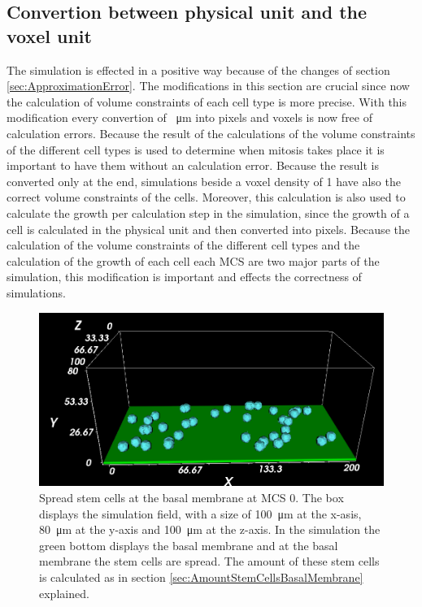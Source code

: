 \subsection{Convertion between physical unit and the voxel unit}
The simulation is effected in a positive way because of the changes of section \ref{sec:ApproximationError}. The modifications in this section are crucial since now the calculation of volume constraints of each cell type is more precise. With this modification every convertion of \SI{}{\micro\metre} into pixels and voxels is now free of calculation errors. Because the result of the calculations of the volume constraints of the different cell types is used to determine when mitosis takes place it is important to have them without an calculation error. Because the result is converted only at the end, simulations beside a voxel density of 1 have also the correct volume constraints of the cells. Moreover, this calculation is also used to calculate the growth per calculation step in the simulation, since the growth of a cell is calculated in the physical unit and then converted into pixels. Because the calculation of the volume constraints of the different cell types and the calculation of the growth of each cell each \ac{MCS} are two major parts of the simulation, this modification is important and effects the correctness of simulations.
\newline
\newline

\begin{figure}[ht]
	\center
	\includegraphics[scale=0.4]{figures/SimulationAtMCS0.png}
	\caption[Spread stem cells at the basal membrane at \ac{MCS} 0]{Spread stem cells at the basal membrane at \ac{MCS} 0. The box displays the simulation field, with a size of \SI{100}{\micro\metre} at the x-asis, \SI{80}{\micro\metre} at the y-axis and \SI{100}{\micro\metre} at the z-axis. In the simulation the green bottom displays the basal membrane and at the basal membrane the stem cells are spread. The amount of these stem cells is calculated as in section \ref{sec:AmountStemCellsBasalMembrane} explained.}
	\label{img:SimulationAtMCS0}
\end{figure}


